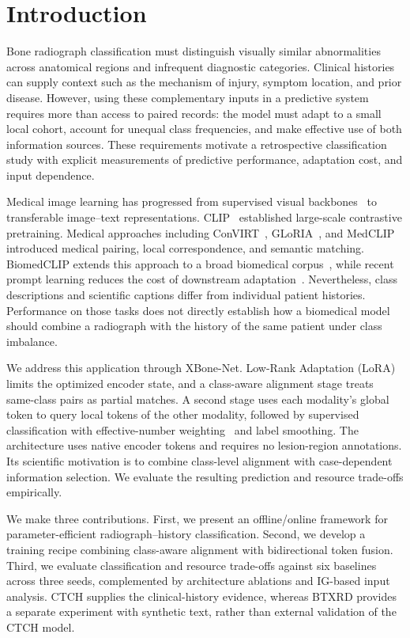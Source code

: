 \documentclass[conference,a4paper]{IEEEtran}
\begin{document}
\section{Introduction}
Bone radiograph classification must distinguish visually similar abnormalities across anatomical regions and infrequent diagnostic categories. Clinical histories can supply context such as the mechanism of injury, symptom location, and prior disease. However, using these complementary inputs in a predictive system requires more than access to paired records: the model must adapt to a small local cohort, account for unequal class frequencies, and make effective use of both information sources. These requirements motivate a retrospective classification study with explicit measurements of predictive performance, adaptation cost, and input dependence.

Medical image learning has progressed from supervised visual backbones~\cite{ResNet,DenseNet} to transferable image--text representations. CLIP~\cite{CLIP} established large-scale contrastive pretraining. Medical approaches including ConVIRT~\cite{ConVIRT}, GLoRIA~\cite{GLoRIA}, and MedCLIP~\cite{MedCLIP} introduced medical pairing, local correspondence, and semantic matching. BiomedCLIP extends this approach to a broad biomedical corpus~\cite{BiomedCLIP}, while recent prompt learning reduces the cost of downstream adaptation~\cite{BiomedCoOp}. Nevertheless, class descriptions and scientific captions differ from individual patient histories. Performance on those tasks does not directly establish how a biomedical model should combine a radiograph with the history of the same patient under class imbalance.

We address this application through XBone-Net. Low-Rank Adaptation (LoRA)~\cite{Hu2022LoRA} limits the optimized encoder state, and a class-aware alignment stage treats same-class pairs as partial matches. A second stage uses each modality's global token to query local tokens of the other modality, followed by supervised classification with effective-number weighting~\cite{Cui2019ClassBalanced} and label smoothing. The architecture uses native encoder tokens and requires no lesion-region annotations. Its scientific motivation is to combine class-level alignment with case-dependent information selection. We evaluate the resulting prediction and resource trade-offs empirically.

We make three contributions. First, we present an offline/online framework for parameter-efficient radiograph--history classification. Second, we develop a training recipe combining class-aware alignment with bidirectional token fusion. Third, we evaluate classification and resource trade-offs against six baselines across three seeds, complemented by architecture ablations and IG-based input analysis. CTCH supplies the clinical-history evidence, whereas BTXRD provides a separate experiment with synthetic text, rather than external validation of the CTCH model.
\end{document}
